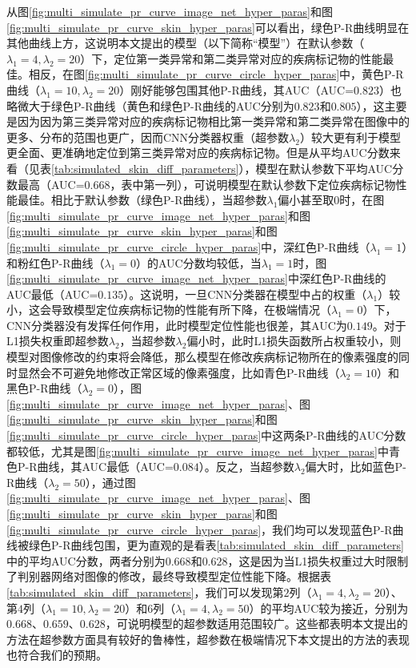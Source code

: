 从图\ref{fig:multi_simulate_pr_curve_image_net_hyper_paras}和图\ref{fig:multi_simulate_pr_curve_skin_hyper_paras}可以看出，绿色P-R曲线明显在其他曲线上方，这说明本文提出的模型（以下简称“模型”）在默认参数（$\lambda_{1}=4,\lambda_{2}=20$）下，定位第一类异常和第二类异常对应的疾病标记物的性能最佳。相反，在图\ref{fig:multi_simulate_pr_curve_circle_hyper_paras}中，黄色P-R曲线（$\lambda_{1}=10,\lambda_{2}=20$）刚好能够包围其他P-R曲线，其AUC（AUC=$0.823$）也略微大于绿色P-R曲线（黄色和绿色P-R曲线的AUC分别为$0.823$和$0.805$），这主要是因为因为第三类异常对应的疾病标记物相比第一类异常和第二类异常在图像中的更多、分布的范围也更广，因而CNN分类器权重（超参数$\lambda_{2}$）较大更有利于模型更全面、更准确地定位到第三类异常对应的疾病标记物。但是从平均AUC分数来看（见表\ref{tab:simulated_skin_diff_parameters}），模型在默认参数下平均AUC分数最高（AUC=$0.668$，表中第一列），可说明模型在默认参数下定位疾病标记物性能最佳。相比于默认参数（绿色P-R曲线），当超参数$\lambda_{1}$偏小甚至取$0$时，在图\ref{fig:multi_simulate_pr_curve_image_net_hyper_paras}和图\ref{fig:multi_simulate_pr_curve_skin_hyper_paras}和图\ref{fig:multi_simulate_pr_curve_circle_hyper_paras}中，深红色P-R曲线（$\lambda_{1}=1$）和粉红色P-R曲线（$\lambda_{1}=0$）的AUC分数均较低，当$\lambda_{1}=1$时，图\ref{fig:multi_simulate_pr_curve_image_net_hyper_paras}中深红色P-R曲线的AUC最低（AUC=$0.135$）。这说明，一旦CNN分类器在模型中占的权重（$\lambda_{1}$）较小，这会导致模型定位疾病标记物的性能有所下降，在极端情况（$\lambda_{1}=0$）下，CNN分类器没有发挥任何作用，此时模型定位性能也很差，其AUC为$0.149$。对于L1损失权重即超参数$\lambda_{2}$，当超参数$\lambda_{2}$偏小时，此时L1损失函数所占权重较小，则模型对图像修改的约束将会降低，那么模型在修改疾病标记物所在的像素强度的同时显然会不可避免地修改正常区域的像素强度，比如青色P-R曲线（$\lambda_{2}=10$）和黑色P-R曲线（$\lambda_2=0$），图\ref{fig:multi_simulate_pr_curve_image_net_hyper_paras}、图\ref{fig:multi_simulate_pr_curve_skin_hyper_paras}和图\ref{fig:multi_simulate_pr_curve_circle_hyper_paras}中这两条P-R曲线的AUC分数都较低，尤其是图\ref{fig:multi_simulate_pr_curve_image_net_hyper_paras}中青色P-R曲线，其AUC最低（AUC=$0.084$）。反之，当超参数$\lambda_{2}$偏大时，比如蓝色P-R曲线（$\lambda_{2}=50$），通过图\ref{fig:multi_simulate_pr_curve_image_net_hyper_paras}、图\ref{fig:multi_simulate_pr_curve_skin_hyper_paras}和图\ref{fig:multi_simulate_pr_curve_circle_hyper_paras}，我们均可以发现蓝色P-R曲线被绿色P-R曲线包围，更为直观的是看表\ref{tab:simulated_skin_diff_parameters}中的平均AUC分数，两者分别为$0.668$和$0.628$，这是因为当L1损失权重过大时限制了判别器网络对图像的修改，最终导致模型定位性能下降。根据表\ref{tab:simulated_skin_diff_parameters}，我们可以发现第$2$列（$\lambda_{1}=4,\lambda_{2}=20$）、第$4$列（$\lambda_{1}=10,\lambda_{2}=20$）和$6$列（$\lambda_{1}=4,\lambda_{2}=50$）的平均AUC较为接近，分别为$0.668$、$0.659$、$0.628$，可说明模型的超参数适用范围较广。这些都表明本文提出的方法在超参数方面具有较好的鲁棒性，超参数在极端情况下本文提出的方法的表现也符合我们的预期。

